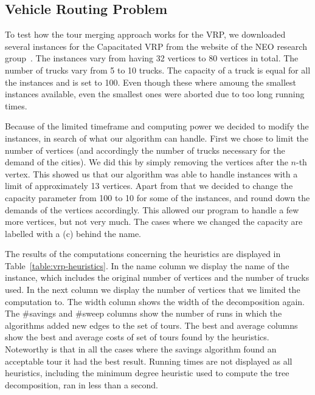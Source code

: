 \documentclass[12pt]{article}
\begin{document}
    \subsection{Vehicle Routing Problem}
    To test how the tour merging approach works for the VRP, we downloaded several instances
    for the Capacitated VRP from the website of the NEO research group~\cite{vrp-instances}.
    The instances vary from having 32 vertices to 80 vertices in total. The number of trucks vary
    from 5 to 10 trucks. The capacity of a truck is equal for all the instances and is set to 100.
    Even though these where amoung the smallest instances available, even the smallest ones were
    aborted due to too long running times.

    Because of the limited timeframe and computing power we decided to modify the instances, in
    search of what our algorithm can handle.
    First we chose to limit the number of vertices (and accordingly the number of trucks
    necessary for the demand of the cities). We did this by simply removing the vertices after the
    $n$-th vertex. This showed us that our algorithm was able to handle instances with a limit of
    approximately 13 vertices.
    Apart from that we decided to change the capacity parameter from 100 to 10 for some of the
    instances, and round down the demands of the vertices accordingly. This allowed our program to
    handle a few more vertices, but not very much. The cases where we changed the capacity are
    labelled with a (c) behind the name.

    The results of the computations concerning the heuristics are displayed in
    Table~\ref{table:vrp-heuristics}. In the name column we display the name of the instance, which
    includes the original number of vertices and the number of trucks used. In the next column we
    display the number of vertices that we limited the computation to. The width column shows the
    width of the decomposition again. The \#savings and \#sweep columns show the number of runs in
    which the algorithms added new edges to the set of tours. The best and average columns show the
    best and average costs of set of tours found by the heuristics. Noteworthy is that in all the
    cases where the savings algorithm found an acceptable tour it had the best result.
    Running times are not displayed as all heuristics, including the minimum degree heuristic used
    to compute the tree decomposition, ran in less than a second.
\end{document}
